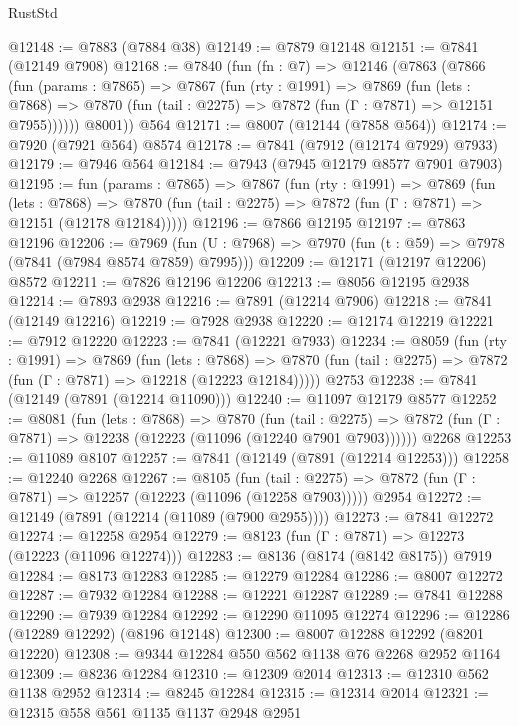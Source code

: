 \begin{lexlean}{RustStd}
\begin{coremodule}
@12148 := @7883 (@7884 @38)
@12149 := @7879 @12148
@12151 := @7841 (@12149 @7908)
@12168 := @7840
    (fun (fn : @7) =>
    @12146
      (@7863
        (@7866
          (fun (params : @7865) =>
          @7867
            (fun (rty : @1991) =>
            @7869
              (fun (lets : @7868) =>
              @7870 (fun (tail : @2275) => @7872 (fun (Γ : @7871) => @12151 @7955))))))
        @8001))
    @564
@12171 := @8007 (@12144 (@7858 @564))
@12174 := @7920 (@7921 @564) @8574
@12178 := @7841 (@7912 (@12174 @7929) @7933)
@12179 := @7946 @564
@12184 := @7943 (@7945 @12179 @8577 @7901 @7903)
@12195 := fun (params : @7865) =>
  @7867
    (fun (rty : @1991) =>
    @7869
      (fun (lets : @7868) =>
      @7870 (fun (tail : @2275) => @7872 (fun (Γ : @7871) => @12151 (@12178 @12184)))))
@12196 := @7866 @12195
@12197 := @7863 @12196
@12206 := @7969
    (fun (U : @7968) => @7970 (fun (t : @59) => @7978 (@7841 (@7984 @8574 @7859) @7995)))
@12209 := @12171 (@12197 @12206) @8572
@12211 := @7826 @12196 @12206
@12213 := @8056 @12195 @2938
@12214 := @7893 @2938
@12216 := @7891 (@12214 @7906)
@12218 := @7841 (@12149 @12216)
@12219 := @7928 @2938
@12220 := @12174 @12219
@12221 := @7912 @12220
@12223 := @7841 (@12221 @7933)
@12234 := @8059
    (fun (rty : @1991) =>
    @7869
      (fun (lets : @7868) =>
      @7870 (fun (tail : @2275) => @7872 (fun (Γ : @7871) => @12218 (@12223 @12184)))))
    @2753
@12238 := @7841 (@12149 (@7891 (@12214 @11090)))
@12240 := @11097 @12179 @8577
@12252 := @8081
    (fun (lets : @7868) =>
    @7870
      (fun (tail : @2275) =>
      @7872 (fun (Γ : @7871) => @12238 (@12223 (@11096 (@12240 @7901 @7903))))))
    @2268
@12253 := @11089 @8107
@12257 := @7841 (@12149 (@7891 (@12214 @12253)))
@12258 := @12240 @2268
@12267 := @8105
    (fun (tail : @2275) => @7872 (fun (Γ : @7871) => @12257 (@12223 (@11096 (@12258 @7903)))))
    @2954
@12272 := @12149 (@7891 (@12214 (@11089 (@7900 @2955))))
@12273 := @7841 @12272
@12274 := @12258 @2954
@12279 := @8123 (fun (Γ : @7871) => @12273 (@12223 (@11096 @12274)))
@12283 := @8136 (@8174 (@8142 @8175)) @7919
@12284 := @8173 @12283
@12285 := @12279 @12284
@12286 := @8007 @12272
@12287 := @7932 @12284
@12288 := @12221 @12287
@12289 := @7841 @12288
@12290 := @7939 @12284
@12292 := @12290 @11095 @12274
@12296 := @12286 (@12289 @12292) (@8196 @12148)
@12300 := @8007 @12288 @12292 (@8201 @12220)
@12308 := @9344 @12284 @550 @562 @1138 @76 @2268 @2952 @1164
@12309 := @8236 @12284
@12310 := @12309 @2014
@12313 := @12310 @562 @1138 @2952
@12314 := @8245 @12284
@12315 := @12314 @2014
@12321 := @12315 @558 @561 @1135 @1137 @2948 @2951

\end{coremodule}
\end{lexlean}
